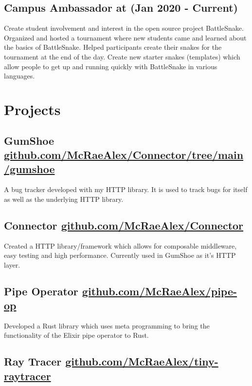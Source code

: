 \documentclass{article}
\newcommand{\hrefColored}[3]{\href{#2}{\color{#1}{#3}}}
\begin{document}
\subsection{Campus Ambassador at \hrefColored{blue}{https://play.battlesnake.com/}{BattleSnake} (Jan 2020 - Current)}

Create student involvement and interest in the open source project BattleSnake.
Organized and hosted a tournament where new students came and learned about the 
basics of BattleSnake. Helped participants create their snakes for the tournament at the end of
the day. Create new starter snakes (templates) which allow people to get up and 
running quickly with BattleSnake in various languages.

\section{Projects}

\subsection{GumShoe \href{https://github.com/McRaeAlex/Connector/tree/main/gumshoe}{github.com/McRaeAlex/Connector/tree/main/gumshoe}}

A bug tracker developed with my HTTP library. It is used to track bugs for itself as well as the underlying HTTP library.

\subsection{Connector \href{https://github.com/McRaeAlex/Connector}{github.com/McRaeAlex/Connector}}

Created a HTTP library/framework which allows for composable middleware, easy testing and high performance. Currently used in GumShoe as it's HTTP layer.

\subsection{Pipe Operator \href{https://github.com/McRaeAlex/pipe-op}{github.com/McRaeAlex/pipe-op}}

Developed a Rust library which uses meta programming to bring the functionality of the Elixir pipe operator to Rust.

\subsection{Ray Tracer \href{https://github.com/McRaeAlex/tiny-raytracer}{github.com/McRaeAlex/tiny-raytracer}}
\end{document}
